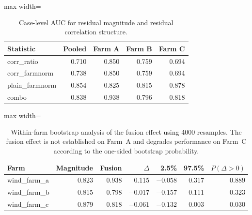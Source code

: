 \documentclass[10pt]{article}
\begin{document}

\begin{table}[htbp]
\centering
\small
\caption{Case-level AUC for residual magnitude and residual
correlation structure.}
\label{tab:corr}
\begin{adjustbox}{max width=\textwidth}
\begin{tabular}{lrrrr}
\toprule
Statistic
& Pooled
& Farm A
& Farm B
& Farm C \\
\midrule
corr\_ratio
& 0.710
& 0.850
& 0.759
& 0.694 \\
corr\_farmnorm
& 0.738
& 0.850
& 0.759
& 0.694 \\
plain\_farmnorm
& 0.854
& 0.825
& 0.815
& 0.878 \\
combo
& 0.838
& 0.938
& 0.796
& 0.818 \\
\bottomrule
\end{tabular}
\end{adjustbox}
\end{table}



\begin{table}[htbp]
\centering
\small
\caption{Within-farm bootstrap analysis of the fusion effect using
4000 resamples. The fusion effect is not established on Farm~A and
degrades performance on Farm~C according to the one-sided bootstrap
probability.}
\label{tab:fusion}
\begin{adjustbox}{max width=\textwidth}
\begin{tabular}{lrrrrrr}
\toprule
Farm
& Magnitude
& Fusion
& $\Delta$
& 2.5\%
& 97.5\%
& $P(\Delta>0)$ \\
\midrule
wind\_farm\_a
& 0.823
& 0.938
& 0.115
& $-0.058$
& 0.317
& 0.889 \\
wind\_farm\_b
& 0.815
& 0.798
& $-0.017$
& $-0.157$
& 0.111
& 0.323 \\
wind\_farm\_c
& 0.879
& 0.818
& $-0.061$
& $-0.132$
& 0.003
& 0.030 \\
\bottomrule
\end{tabular}
\end{adjustbox}
\end{table}

\FloatBarrier
\end{document}
